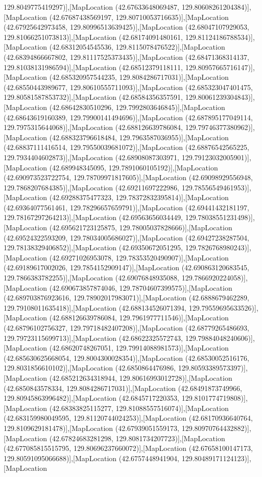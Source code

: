 129.8049775419297)],[MapLocation (42.67633648069487, 129.80608261204384)],[MapLocation (42.67687438569197, 129.80710053716635)],[MapLocation (42.67925642973458, 129.80996513639425)],[MapLocation (42.68047107929053, 129.81066251073813)],[MapLocation (42.68174091480161, 129.81124186788534)],[MapLocation (42.68312054545536, 129.8115078476522)],[MapLocation (42.68394866667802, 129.81117525373435)],[MapLocation (42.68471368314137, 129.81038131986594)],[MapLocation (42.68512379118111, 129.80957665716147)],[MapLocation (42.685320957544235, 129.8084286717031)],[MapLocation (42.68550443989677, 129.80610555711093)],[MapLocation (42.685323047401475, 129.80581587853732)],[MapLocation (42.68584356357591, 129.80061239304843)],[MapLocation (42.68642830510296, 129.7992803646845)],[MapLocation (42.68643619160389, 129.79900141494696)],[MapLocation (42.687895177049114, 129.7975315644068)],[MapLocation (42.688126639786084, 129.79746377380962)],[MapLocation (42.688323796618484, 129.7963587036955)],[MapLocation (42.68837111416514, 129.79550039681072)],[MapLocation (42.68876542565225, 129.7934404602873)],[MapLocation (42.68908087303971, 129.79123032005901)],[MapLocation (42.689948345095, 129.7891060105192)],[MapLocation (42.690973523722754, 129.78709971817605)],[MapLocation (42.69098929556948, 129.7868207684385)],[MapLocation (42.69211697222986, 129.78556549461953)],[MapLocation (42.69288375477323, 129.78372832395814)],[MapLocation (42.69364077561461, 129.78296657659791)],[MapLocation (42.69441432181197, 129.78167297264213)],[MapLocation (42.69563656034449, 129.78038551231498)],[MapLocation (42.695621723125875, 129.78005037828666)],[MapLocation (42.69524322593209, 129.78034005686027)],[MapLocation (42.69427238287504, 129.78138329406852)],[MapLocation (42.69350672051295, 129.7826768980243)],[MapLocation (42.69271026953078, 129.78353520490907)],[MapLocation (42.69189617002026, 129.7854152909147)],[MapLocation (42.690863120683545, 129.7866383782255)],[MapLocation (42.69076848935088, 129.7866920224058)],[MapLocation (42.690673857874046, 129.78704607399575)],[MapLocation (42.689703876923616, 129.78902017983071)],[MapLocation (42.6888679462289, 129.79108011635418)],[MapLocation (42.688134526071394, 129.79559695633526)],[MapLocation (42.688126639786084, 129.7961977711546)],[MapLocation (42.68796102756327, 129.79718482407208)],[MapLocation (42.68779265486693, 129.79723115699713)],[MapLocation (42.68622325572743, 129.79884048240606)],[MapLocation (42.68620748267051, 129.79914088981573)],[MapLocation (42.685630625668054, 129.8004300028354)],[MapLocation (42.68530052516176, 129.8031856610102)],[MapLocation (42.6850864476986, 129.80593389573397)],[MapLocation (42.685212634318944, 129.80616993012728)],[MapLocation (42.6850843578334, 129.8084286717031)],[MapLocation (42.68491873749966, 129.80945863996482)],[MapLocation (42.6845717220353, 129.8101774719808)],[MapLocation (42.68383825115277, 129.81088557516074)],[MapLocation (42.683159980049595, 129.81120744024253)],[MapLocation (42.68170936640764, 129.8109629181478)],[MapLocation (42.67939051559173, 129.80970764432882)],[MapLocation (42.67824683281298, 129.8081734207723)],[MapLocation (42.677085815515795, 129.80696237660072)],[MapLocation (42.67658100147173, 129.80591095066688)],[MapLocation (42.6757448941904, 129.80489171124123)],[MapLocation 